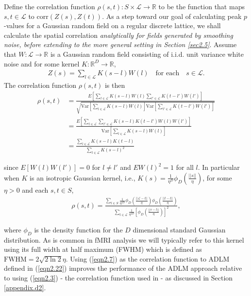 \documentclass{article}
\newcommand{\Var}{\mathrm{Var}}
\newcommand{\Corr}{\mathrm{corr}}
\newcommand{\nt}[1]{\textit{\color{red} #1}}
\begin{document}
Define the correlation function $\rho(s, t): S \times \mathcal{L} \rightarrow \mathbb{R}$ to be the function that maps $s, t\in \mathcal{L}$ to $\Corr(Z(s),Z(t))$. As a step toward our goal of calculating peak $p$-values for a Gaussian random field on a regular discrete lattice, we shall calculate the spatial correlation \nt{analytically for fields generated by smoothing noise, before extending to the more general setting in Section \ref{sec2.5}}. Assume that $W:\mathcal{L} \rightarrow \mathbb{R}$ is a Gaussian random field consisting of i.i.d. unit variance white noise and for some kernel $K:\mathbb{R}^D  \rightarrow \mathbb{R}$,
\begin{align*}
    Z(s) = \sum_{l \in \mathcal{L}} K(s-l)W(l) \quad \text{for each}\quad s\in \mathcal{L}.
\end{align*}
The correlation function $\rho(s,t)$ is then
\begin{align*}
    \rho(s, t)  &= \frac{E\left[\sum_{l \in \mathcal{L}} K(s-l)W(l)\sum_{l'\in \mathcal{L}}K(t-l')W(l')\right]}{\sqrt{\Var\left[\sum_{l \in \mathcal{L}} K(s-l)W(l)\right]\Var\left[\sum_{l'\in \mathcal{L}}K(t-l')W(l')\right]}}\nonumber\\
    &=\frac{ E\left[\sum_{l \in \mathcal{L}}\sum_{l'\in \mathcal{L}}K(s-l)K(t-l')W(l)W(l')\right]}{\Var\left[\sum_{l \in \mathcal{L}} K(s-l)W(l)\right]}\nonumber\\
    &= \frac{\sum_{l\in \mathcal{L}}K(s-l)K(t-l)}{\sum_{l \in \mathcal{L}} K(s-l)^2}
\end{align*}

since $E[W(l)W(l')] = 0$ for $l \neq l'$ and $EW(l)^2 = 1$ for all $l$. In particular when $K$ is an isotropic Gaussian kernel, i.e., $K(s) = \frac{1}{\eta^D}\phi_D\left(\frac{||s||}{\eta}\right)$, for some $\eta > 0$ and each $s, t \in S$, 
\begin{align}
    \rho(s, t) = \frac{\sum_{l\in S}\frac{1}{\eta^{2D}}\phi_D\left(\frac{||\mathcal{L}-l||}{\eta}\right)\phi_D\left(\frac{||t-l||}{\eta}\right)}{\sum_{l\in \mathcal{L}}\frac{1}{\eta^{2D}}\left[\phi_D\left(\frac{||s-l||}{\eta}\right)\right]^2},\label{eqn2.7}
\end{align}

where $\phi_D$ is the density function for the $D$ dimensional standard Gaussian distribution. As is common in fMRI analysis we will typically refer to this kernel using its full width at half maximum (FWHM) which is defined as $\text{FWHM} = 2\sqrt{2\ln2}\eta$. Using (\ref{eqn2.7}) as the correlation function to ADLM defined in (\ref{eqn2.22}) improves the performance of the ADLM approach relative to using (\ref{eqn2.3}) - the correlation function used in \cite{worsley2005improved} - as discussed in Section \ref{appendix.d2}.
\end{document}
